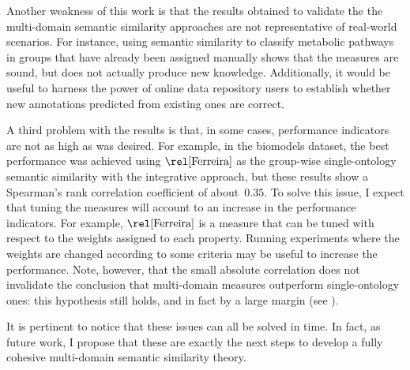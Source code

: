 Another weakness of this work is that the results obtained to validate the the multi-domain semantic similarity approaches are not representative of real-world scenarios. For instance, using semantic similarity to classify metabolic pathways in groups that have already been assigned manually shows that the measures are sound, but does not actually produce new knowledge. Additionally, it would be useful to harness the power of online data repository users to establish whether new annotations predicted from existing ones are correct.

A third problem with the results is that, in some cases, performance indicators are not as high as was desired. For example, in the biomodels dataset, the best performance was achieved using $\ferreira$ as the group-wise single-ontology semantic similarity with the integrative approach, but these results show a Spearman's rank correlation coefficient of about~$0.35$. To solve this issue, I expect that tuning the measures will account to an increase in the performance indicators. For example, $\ferreira$ is a measure that can be tuned with respect to the weights assigned to each property. Running experiments where the weights are changed according to some criteria may be useful to increase the performance. Note, however, that the small absolute correlation does not invalidate the conclusion that multi-domain measures outperform single-ontology ones: this hypothesis still holds, and in fact by a large margin (see \eg {}).


It is pertinent to notice that these issues can all be solved in time. In fact, as future work, I propose that these are exactly the next steps to develop a fully cohesive multi-domain semantic similarity theory.


